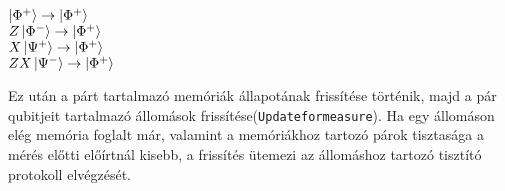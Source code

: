 \begin{center}
$\ket{\Phi^+} \rightarrow \ket{\Phi^+}$ \\
$Z\ket{\Phi^-} \rightarrow \ket{\Phi^+}$ \\
$X\ket{\Psi^+} \rightarrow \ket{\Phi^+}$ \\
$ZX\ket{\Psi^-} \rightarrow \ket{\Phi^+}$ \\
\end{center}
Ez után a párt tartalmazó memóriák állapotának frissítése történik, majd a pár qubitjeit tartalmazó állomások frissítése(\texttt{Updateformeasure}).
Ha egy állomáson elég memória foglalt már, valamint a memóriákhoz tartozó párok tisztasága a mérés előtti előírtnál kisebb, a frissítés ütemezi az állomáshoz tartozó tisztító protokoll elvégzését.